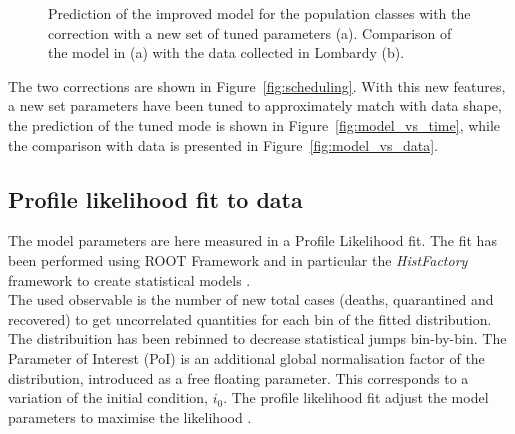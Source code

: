 \begin{figure}
\centering
{}
  \caption{Prediction of the improved model for the population classes with the correction with a new set of tuned parameters (a). Comparison of the model in (a) with the data collected in Lombardy (b).}
  
\end{figure}

The two corrections are shown in Figure~\ref{fig:scheduling}. With this new features, a new set parameters have been tuned to approximately match with data shape, the prediction of the tuned mode is shown in Figure~\ref{fig:model_vs_time}, while the comparison with data is presented in Figure~\ref{fig:model_vs_data}.\\


\subsection{Profile likelihood fit to data}
\label{ssec:plf}

The model parameters are here measured in a Profile Likelihood fit. The fit has been performed using \textsc{ROOT} Framework \cite{ROOT} and in particular the \emph{HistFactory} framework to create statistical models \cite{HistFactory}.\\

 The used observable is the number of new total cases (deaths, quarantined and recovered) to get uncorrelated quantities for each bin of the fitted distribution. The distribuition has been rebinned to decrease statistical jumps bin-by-bin. The Parameter of Interest (PoI) is an additional global normalisation factor of the distribution, introduced as a free floating parameter. This corresponds to a variation of the initial condition, $i_0$. The profile likelihood fit adjust the model parameters to maximise the likelihood \cite{HistFactory}.\\
 
